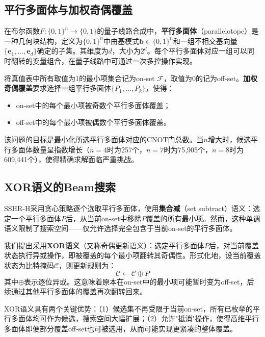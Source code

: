 \documentclass[10.5pt,compsoc,UTF8]{CjC}
\newcommand{\heiti}{\CJKfamily{STHeiti}}
\theoremstyle{mystyle}
\begin{document}
\subsection{\heiti 平行多面体与加权奇偶覆盖}

在布尔函数$F:\{0,1\}^n \to \{0,1\}$的量子线路合成中，\textbf{平行多面体}（parallelotope）是一种几何块结构，定义为$\{0,1\}^n$中由基模式$\mathbf{b}\in\{0,1\}^n$和一组不相交基向量$\{\mathbf{e}_1,\ldots,\mathbf{e}_d\}$确定的子集。其维度为$d$，大小为$2^d$。每个平行多面体对应一组可以同时翻转的变量组合，在量子线路中可通过一次多控操作实现。

将真值表中所有取值为1的最小项集合记为on-set $\mathcal{F}$，取值为0的记为off-set。\textbf{加权奇偶覆盖}要求选择一组平行多面体$\{P_1,\ldots,P_k\}$，使得：
\begin{itemize}[noitemsep,nolistsep]
  \item on-set中的每个最小项被奇数个平行多面体覆盖；
  \item off-set中的每个最小项被偶数个平行多面体覆盖。
\end{itemize}
该问题的目标是最小化所选平行多面体对应的CNOT门总数。当$n$增大时，候选平行多面体数量呈指数增长（$n=4$时为257个，$n=7$时为75{,}905个，$n=8$时为609{,}441个），使得精确求解面临严重挑战。

\subsection{\heiti XOR语义的Beam搜索}
\label{sec:xor-beam}

SSHR-H\cite{zheng2025cnot}采用贪心策略逐个选取平行多面体，使用\textbf{集合减}（set subtract）语义：选定一个平行多面体$P$后，从当前on-set中移除$P$覆盖的所有最小项。然而，这种单调语义限制了搜索空间——仅允许选择完全包含于当前on-set的平行多面体。

我们提出采用\textbf{XOR语义}（又称奇偶更新语义）：选定平行多面体$P$后，对当前覆盖状态执行异或操作，即被覆盖的每个最小项翻转其奇偶性。形式化地，设当前覆盖状态为比特掩码$\mathcal{C}$，则更新规则为：
\begin{equation}
  \mathcal{C} \gets \mathcal{C} \oplus P
\end{equation}
其中$\oplus$表示逐位异或。这意味着原本在on-set中的最小项可能暂时变为off-set，后续通过其他平行多面体的覆盖再次翻转回来。

XOR语义具有两个关键优势：（1）候选集不再受限于当前on-set，所有已枚举的平行多面体均可作为候选，搜索空间大幅扩展；（2）允许"抵消"操作，使得高维平行多面体即便部分覆盖off-set也可被选用，从而可能实现更紧凑的整体覆盖。
\end{document}
